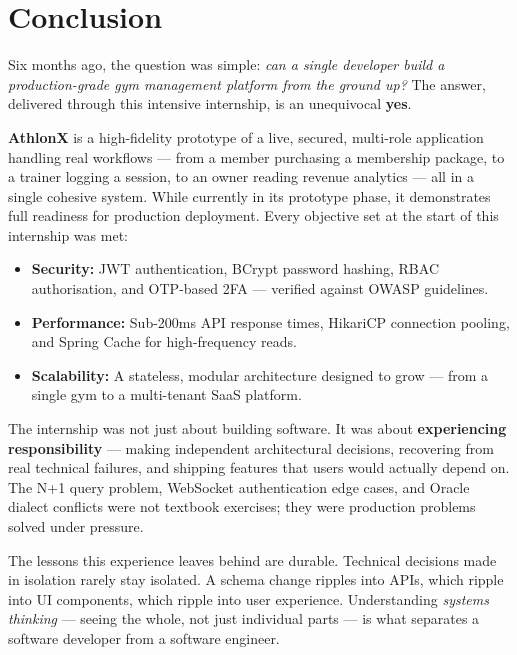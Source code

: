 \documentclass[
  12pt,
  a4paperpaper,
]{report}
\begin{document}
\chapter{Conclusion}\label{conclusion-1}

\noindent
Six months ago, the question was simple: \textit{can a single developer build a production-grade gym management platform from the ground up?} The answer, delivered through this intensive internship, is an unequivocal \textbf{yes}.

\vspace{0.15cm}

\noindent
\textbf{AthlonX} is a high-fidelity prototype of a live, secured, multi-role application handling real workflows --- from a member purchasing a membership package, to a trainer logging a session, to an owner reading revenue analytics --- all in a single cohesive system. While currently in its prototype phase, it demonstrates full readiness for production deployment. Every objective set at the start of this internship was met:

\vspace{0.15cm}

\begin{itemize}
  \setlength\itemsep{0.18cm}
  \item \textbf{Security:} JWT authentication, BCrypt password hashing, RBAC authorisation, and OTP-based 2FA --- verified against OWASP guidelines.
  \item \textbf{Performance:} Sub-200ms API response times, HikariCP connection pooling, and Spring Cache for high-frequency reads.
  \item \textbf{Scalability:} A stateless, modular architecture designed to grow --- from a single gym to a multi-tenant SaaS platform.
\end{itemize}

\vspace{0.15cm}

\noindent
The internship was not just about building software. It was about \textbf{experiencing responsibility} --- making independent architectural decisions, recovering from real technical failures, and shipping features that users would actually depend on. The N+1 query problem, WebSocket authentication edge cases, and Oracle dialect conflicts were not textbook exercises; they were production problems solved under pressure.

\vspace{0.15cm}

\noindent
The lessons this experience leaves behind are durable. Technical decisions made in isolation rarely stay isolated. A schema change ripples into APIs, which ripple into UI components, which ripple into user experience. Understanding \textit{systems thinking} --- seeing the whole, not just individual parts --- is what separates a software developer from a software engineer.
\end{document}
